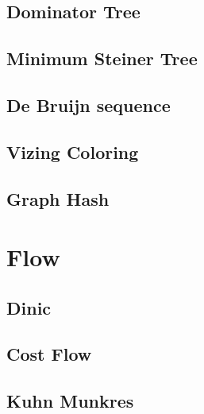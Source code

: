 \documentclass[a4paper,10pt,twocolumn,oneside]{article}
\begin{document}
\subsection{Dominator Tree}


\subsection{Minimum Steiner Tree}


\subsection{De Bruijn sequence}


\subsection{Vizing Coloring}


\subsection{Graph Hash}


\section{Flow}
%

\subsection{Dinic} %


\subsection{Cost Flow} %


\subsection{Kuhn Munkres}

\end{document}
